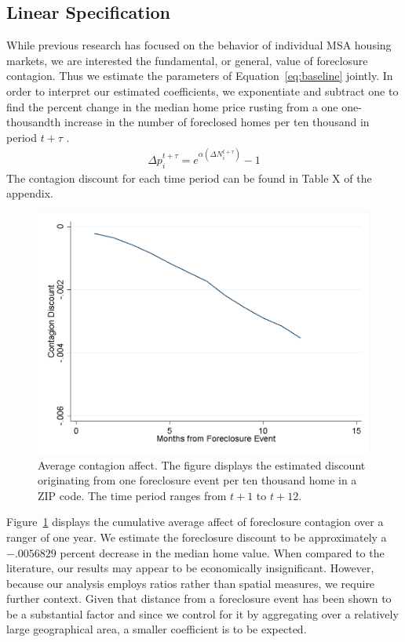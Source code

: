 \documentclass[12pt,oneside]{amsbook}
\begin{document}
\subsection{Linear Specification}    
\indent While previous research has focused on the behavior of individual MSA housing markets, we are interested the fundamental, or general, value of foreclosure contagion. Thus we estimate the parameters of Equation~\ref{eq:baseline} jointly. In order to interpret our estimated coefficients, we exponentiate and subtract one to find the percent change in the median home price rusting from a one one-thousandth increase in the number of foreclosed homes per ten thousand in period $t + \tau$ . 
\begin{align*}
\Delta p_i^{t + \tau} = e^{\alpha (\Delta N_i^{t + \tau})} -1
\end{align*}
    The contagion discount for each time period can be found in Table X of the appendix. \\
\begin{figure}\label{fig:avg}
\centering

\includegraphics[width=\textwidth]{20MSA_solo.png}
\caption{\tiny Average contagion affect. The figure displays the estimated discount originating from one foreclosure event per ten thousand home in a ZIP code. The time period ranges from $t+1$ to $t+12$. }


\end{figure}
    Figure~\ref{fig:avg} displays the cumulative average affect of foreclosure contagion over a ranger of one year. We estimate the foreclosure discount to be approximately a $-.0056829$ percent decrease in the median home value. When compared to the literature, our results may appear to be economically insignificant. However, because our analysis employs ratios rather than spatial measures, we require further context. Given that distance from a foreclosure event has been shown to be a substantial factor and since we control for it by aggregating over a relatively large geographical area, a smaller coefficient is to be expected. 
    
\end{document}
